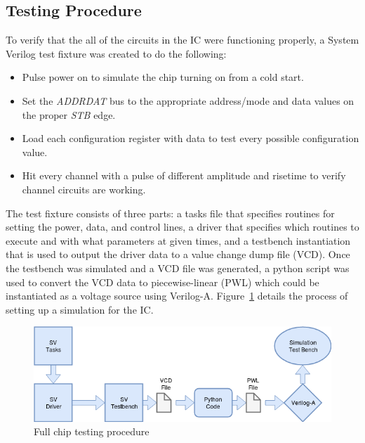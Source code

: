 \documentclass[12pt,oneside,final]{siuethesis}
\theoremstyle{definition}
\begin{document}
\subsection{Testing Procedure}
\par To verify that the all of the circuits in the IC were functioning properly, a System Verilog test fixture was created to do the following:
\begin{itemize}
\item Pulse power on to simulate the chip turning on from a cold start.
\item Set the \emph{ADDRDAT} bus to the appropriate address/mode and data values on the proper \emph{STB} edge.
\item Load each configuration register with data to test every possible configuration value.
\item Hit every channel with a pulse of different amplitude and risetime to verify channel circuits are working.
\end{itemize}

\par The test fixture consists of three parts: a tasks file that specifies routines for setting the power, data, and control lines, a driver that specifies which routines to execute and with what parameters at given times, and a testbench instantiation that is used to output the driver data to a value change dump file (VCD). Once the testbench was simulated and a VCD file was generated, a python script was used to convert the VCD data to piecewise-linear (PWL) which could be instantiated as a voltage source using Verilog-A. Figure~\ref{fig:test} details the process of setting up a simulation for the IC.

\begin{figure}[htbp!]
 \centering
 \includegraphics[scale=.55,keepaspectratio=true]{./ch4_figures/sim.png}
 \caption{Full chip testing procedure}
 \label{fig:test}
\end{figure}
\end{document}
